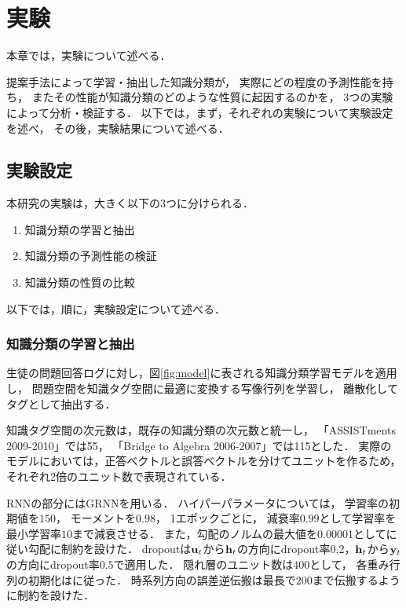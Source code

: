 \chapter{実験}
\label{chap:result}
\fancyhf{}
\rhead{\thepage}
\cfoot{\thepage}


本章では，実験について述べる．

提案手法によって学習・抽出した知識分類が，
実際にどの程度の予測性能を持ち，
またその性能が知識分類のどのような性質に起因するのかを，
3つの実験によって分析・検証する．
以下では，まず，それぞれの実験について実験設定を述べ，
その後，実験結果について述べる．


\section{実験設定}

本研究の実験は，大きく以下の3つに分けられる．
\begin{enumerate}
	\item 知識分類の学習と抽出
	\item 知識分類の予測性能の検証
	\item 知識分類の性質の比較
\end{enumerate}
以下では，順に，実験設定について述べる．


\subsection{知識分類の学習と抽出}
\label{sec:section}
生徒の問題回答ログに対し，図\ref{fig:model}に表される知識分類学習モデルを適用し，
問題空間を知識タグ空間に最適に変換する写像行列を学習し，
離散化してタグとして抽出する．

知識タグ空間の次元数は，既存の知識分類の次元数と統一し，
「ASSISTments 2009-2010」では55，
「Bridge to Algebra 2006-2007」では115とした．
実際のモデルにおいては，正答ベクトルと誤答ベクトルを分けてユニットを作るため，
それぞれ2倍のユニット数で表現されている．

RNNの部分にはGRNNを用いる．
ハイパーパラメータについては，
学習率の初期値を$150$，
モーメントを$0.98$，
1エポックごとに，
減衰率$0.99$として学習率を最小学習率$10$まで減衰させる．
また，勾配のノルムの最大値を$0.00001$として\cite{pascanu2013difficulty}に従い勾配に制約を設けた．
dropoutは${\bf u}_t$から${\bf h}_t$の方向にdropout率$0.2$，${\bf h}_t$から${\bf y}_t$の方向にdropout率$0.5$で適用した．
隠れ層のユニット数は$400$として，
各重み行列の初期化は\cite{glorot2010understanding}に従った．
時系列方向の誤差逆伝搬は最長で$200$まで伝搬するように制約を設けた．

